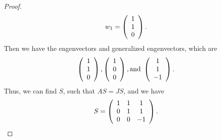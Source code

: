 \documentclass[11pt]{book}
\theoremstyle{definition}
\numberwithin{equation}{chapter}
\begin{document}
\begin{proof}
\begin{align*}
    w_1 = \left(\begin{array}
    [c]{c}%
    1 \\
    1 \\
    0 
    \end{array}\right).
\end{align*}
Then we have the engenvectors and generalized engenvectors, which are 
\begin{align*}
    \left(\begin{array}
    [c]{c}%
    1 \\
    1 \\
    0 
    \end{array}\right),
    \left(\begin{array}
    [c]{c}%
    1 \\
    0 \\
    0 
    \end{array}\right),
    \text{and}\,\,
    \left(\begin{array}
    [c]{c}%
    1 \\
    1 \\
    -1 
    \end{array}\right).
\end{align*}
Thus, we can find $S$, such that $AS=JS$, and we have
\begin{align*}
    S = \left(\begin{array}
    [c]{ccc}%
    1 & 1 & 1\\
    0 & 1 & 1\\
    0 & 0 & -1
    \end{array}\right).
\end{align*}
\end{proof}

\medskip
\end{document}
